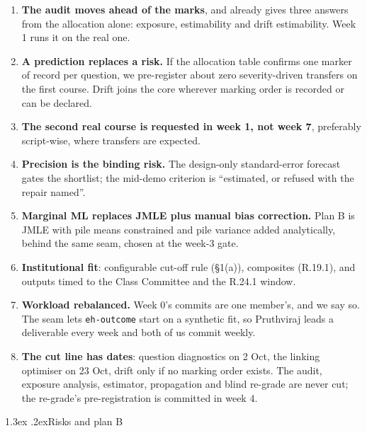 \documentclass[10pt,a4paper]{article}
\makeatletter
\renewcommand\section{\@startsection{section}{1}{\z@}{-2.8ex \@plus -.6ex \@minus -.2ex}%
  {1.3ex \@plus .2ex}{\normalfont\Large\bfseries}}
\makeatother
\begin{document}
\begin{enumerate}[label=R\arabic*.]
\item \textbf{The audit moves ahead of the marks}, and already gives three answers from the
allocation alone: exposure, estimability and drift estimability. Week 1 runs it on the real one.
\item \textbf{A prediction replaces a risk.} If the allocation table confirms one marker of record
per question, we pre-register about zero severity-driven transfers on the first course. Drift joins
the core wherever marking order is recorded or can be declared.
\item \textbf{The second real course is requested in week 1, not week 7}, preferably script-wise,
where transfers are expected.
\item \textbf{Precision is the binding risk.} The design-only standard-error forecast gates the
shortlist; the mid-demo criterion is ``estimated, or refused with the repair named''.
\item \textbf{Marginal ML replaces JMLE plus manual bias correction.} Plan B is JMLE with pile means
constrained and pile variance added analytically, behind the same seam, chosen at the week-3 gate.
\item \textbf{Institutional fit}: configurable cut-off rule (\S1(a)), composites (R.19.1), and outputs
timed to the Class Committee and the R.24.1 window.
\item \textbf{Workload rebalanced.} Week 0's commits are one member's, and we say so. The seam lets
\texttt{eh-outcome} start on a synthetic fit, so Pruthviraj leads a deliverable every week and both
of us commit weekly.
\item \textbf{The cut line has dates}: question diagnostics on 2 Oct, the linking optimiser on 23 Oct,
drift only if no marking order exists. The audit, exposure analysis, estimator, propagation and blind
re-grade are never cut; the re-grade's pre-registration is committed in week 4.
\end{enumerate}

\section{Risks and plan B}
\end{document}
